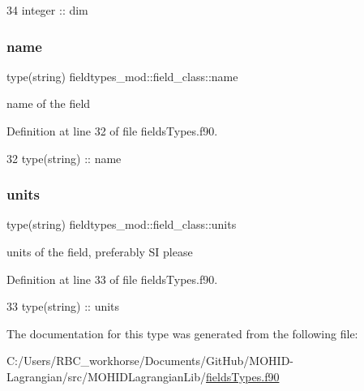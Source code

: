 \begin{DoxyCode}
34         \textcolor{keywordtype}{integer} :: dim
\end{DoxyCode}
\mbox{\label{structfieldtypes__mod_1_1field__class_a0482789d206fc831b81c99daa17069d3}} 
\subsubsection{\texorpdfstring{name}{name}}
{\footnotesize\ttfamily type(string) fieldtypes\+\_\+mod\+::field\+\_\+class\+::name\hspace{0.3cm}{\ttfamily [private]}}



name of the field 



Definition at line 32 of file fields\+Types.\+f90.


\begin{DoxyCode}
32         \textcolor{keywordtype}{type}(string) :: name
\end{DoxyCode}
\mbox{\label{structfieldtypes__mod_1_1field__class_abd4cf1204fbe4f2d174dd81230511077}} 
\subsubsection{\texorpdfstring{units}{units}}
{\footnotesize\ttfamily type(string) fieldtypes\+\_\+mod\+::field\+\_\+class\+::units\hspace{0.3cm}{\ttfamily [private]}}



units of the field, preferably SI please 



Definition at line 33 of file fields\+Types.\+f90.


\begin{DoxyCode}
33         \textcolor{keywordtype}{type}(string) :: units
\end{DoxyCode}


The documentation for this type was generated from the following file\+:\begin{DoxyCompactItemize}
\item 
C\+:/\+Users/\+R\+B\+C\+\_\+workhorse/\+Documents/\+Git\+Hub/\+M\+O\+H\+I\+D-\/\+Lagrangian/src/\+M\+O\+H\+I\+D\+Lagrangian\+Lib/\mbox{\hyperlink{fields_types_8f90}{fields\+Types.\+f90}}\end{DoxyCompactItemize}
